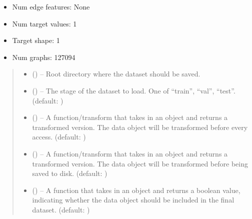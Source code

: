 \documentclass[letterpaper,10pt,english]{sphinxhowto}
\begin{document}
\begin{fulllineitems}
\begin{itemize}
\item {} 
\sphinxAtStartPar
Num edge features: None

\item {} 
\sphinxAtStartPar
Num target values: 1

\item {} 
\sphinxAtStartPar
Target shape: 1

\item {} 
\sphinxAtStartPar
Num graphs: 127094

\end{itemize}
\begin{quote}\begin{description}
\begin{itemize}
\item {} 
\sphinxAtStartPar
{} () – Root directory where the dataset should be saved.

\item {} 
\sphinxAtStartPar
{} () – The stage of the dataset to load. One of “train”, “val”, “test”. (default: )

\item {} 
\sphinxAtStartPar
{} (\sphinxstyleliteralemphasis{\sphinxupquote{, }}) – A function/transform that takes in an  object and returns a transformed version. The data object will be transformed before every access. (default: )

\item {} 
\sphinxAtStartPar
{} (\sphinxstyleliteralemphasis{\sphinxupquote{, }}) – A function/transform that takes in an  object and returns a transformed version. The data object will be transformed before being saved to disk. (default: )

\item {} 
\sphinxAtStartPar
{} (\sphinxstyleliteralemphasis{\sphinxupquote{, }}) – A function that takes in an  object and returns a boolean value, indicating whether the data object should be included in the final dataset. (default: )


\end{itemize}
\end{description}
\end{quote}
\end{fulllineitems}
\end{document}
